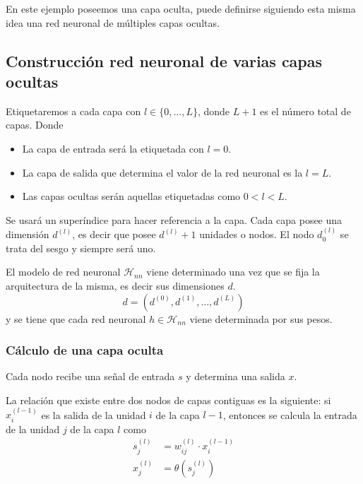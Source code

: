 En este ejemplo poseemos una capa oculta, 
puede definirse siguiendo esta misma idea
una red neuronal de múltiples capas ocultas. 

\subsection{Construcción red neuronal de varias capas ocultas} \label{rrnn:construcción_generalizada}

Etiquetaremos a cada capa con $l \in \{0, \ldots, L \}$, donde $L+1$ es el número total de capas.  Donde 

\begin{itemize}
    \item La capa de entrada será la etiquetada con $l = 0$.
    \item La capa de salida que determina el valor de la red neuronal es la $l=L$.
    \item Las capas ocultas serán aquellas etiquetadas como $0 < l <L.$
\end{itemize}

Se usará un superíndice para hacer referencia a la capa. 
Cada capa posee una dimensión $d^{(l)}$, es decir que posee
$d^{(l)} + 1$ unidades o nodos. El nodo $d_0^{(l)}$ se trata del sesgo y siempre será uno. 

El modelo de red neuronal $\mathcal{H}_{n n}$ viene determinado una vez que se fija la arquitectura de la misma, es decir sus dimensiones $d$. 
\begin{equation}
    d = (d^{(0)}, d^{(1)}, \ldots, d^{(L)})
\end{equation}
y se tiene que cada red neuronal $h \in \mathcal{H}_{n n}$
viene determinada por sus pesos. 

\subsubsection*{Cálculo de una capa oculta}  
Cada nodo recibe una señal de entrada $s$ y determina una salida $x$. 
  
La relación que existe entre dos nodos de capas contiguas es la siguiente: si $x_i^{(l-1)}$ es la salida de la unidad $i$ de la capa $l-1$, 
entonces se calcula la entrada de la unidad $j$ de la capa $l$ como 
\begin{align}\label{eq:construcción_red_neuronas:calculo_una_capa_oculta}
    s_j^{(l)} &= w_{i j}^{(l)} \cdot x_i^{(l-1)}  \\
    x_j^{(l)} &= \theta(s_j^{(l)})
\end{align}

